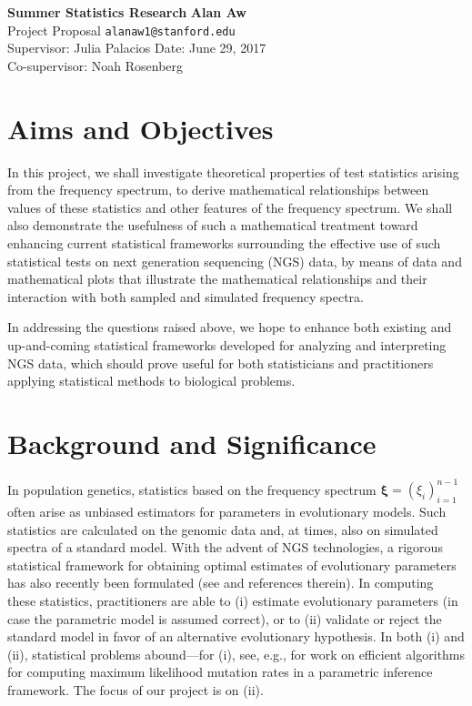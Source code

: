 \documentclass[lettersize, 10.5pt]{article}
\begin{document}
\noindent
\large{\bfseries{\sffamily Summer Statistics Research}} \hfill {\bfseries{\sffamily Alan Aw}} \\
\normalsize Project Proposal \hfill \texttt{alanaw1@stanford.edu} \\
Supervisor: Julia Palacios \hfill Date: June 29, 2017\\
Co-supervisor: Noah Rosenberg

\section*{Aims and Objectives}

In this project, we shall investigate theoretical properties of test statistics arising from the frequency spectrum, to derive mathematical relationships between values of these statistics and other features of the frequency spectrum. We shall also demonstrate the usefulness of such a mathematical treatment toward enhancing current statistical frameworks surrounding the effective use of such statistical tests on next generation sequencing (NGS) data, by means of data and mathematical plots that illustrate the mathematical relationships and their interaction with both sampled and simulated frequency spectra. 

In addressing the questions raised above, we hope to enhance both existing and up-and-coming statistical frameworks developed for analyzing and interpreting NGS data, which should prove useful for both statisticians and practitioners applying statistical methods to biological problems. 

\section*{Background and Significance}

In population genetics, statistics based on the frequency spectrum $\boldsymbol{\xi}=(\xi_i)_{i=1}^{n-1}$ often arise as unbiased estimators for parameters in evolutionary models. Such statistics are calculated on the genomic data and, at times, also on simulated spectra of a standard model. With the advent of NGS technologies, a rigorous statistical framework for obtaining optimal estimates of evolutionary parameters has also recently been formulated (see \cite{Ferretti2013} and references therein). In computing these statistics, practitioners are able to (i) estimate evolutionary parameters (in case the parametric model is assumed correct), or to (ii) validate or reject the standard model in favor of an alternative evolutionary hypothesis. In both (i) and (ii), statistical problems abound---for (i), see, e.g., \cite{Bhaskar2015} for work on efficient algorithms for computing maximum likelihood mutation rates in a parametric inference framework. The focus of our project is on (ii). 
\end{document}
